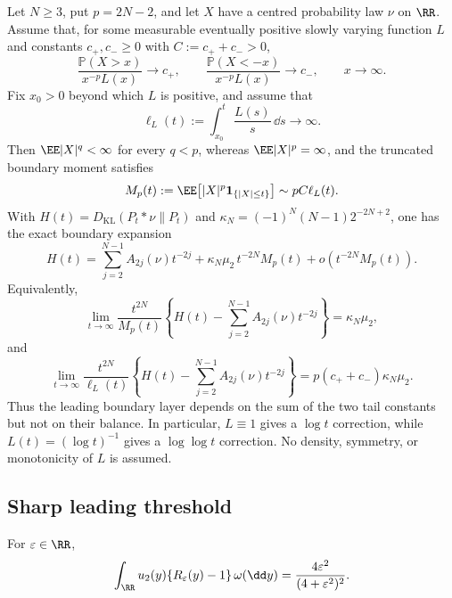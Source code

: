 \begin{theorem}%
\label{cor:main-body-conditional-missing-top-moment-tail}
Let \(N\ge3\), put \(p=2N-2\), and let \(X\) have a centred probability
law \(\nu\) on \(\RR\).  Assume that, for some measurable eventually
positive slowly varying function \(L\) and constants \(c_+,c_-\ge0\) with
\(C:=c_++c_->0\),
\[
 \frac{\mathbb P(X>x)}{x^{-p}L(x)}\longrightarrow c_+,\qquad
 \frac{\mathbb P(X<-x)}{x^{-p}L(x)}\longrightarrow c_-,
 \qquad x\to\infty.
\]
Fix \(x_0>0\) beyond which \(L\) is positive, and assume that
\[
 \ell_L(t):=\int_{x_0}^{t}\frac{L(s)}s\,\dd s\longrightarrow\infty.
\]
Then \(\EE|X|^q<\infty\) for every \(q<p\), whereas
\(\EE|X|^p=\infty\), and the truncated boundary moment satisfies
\[
 M_p(t):=\EE\!\left[|X|^p\mathbf1_{\{|X|\le t\}}\right]
 \sim pC\ell_L(t).
\]
With \(H(t)=D_{\mathrm{KL}}(P_t*\nu\|P_t)\) and
\(\kappa_N=(-1)^N(N-1)2^{-2N+2}\), one has the exact boundary expansion
\[
H(t)=
\sum_{j=2}^{N-1}A_{2j}(\nu)t^{-2j}
+\kappa_N\mu_2\,t^{-2N}M_p(t)
+o(t^{-2N}M_p(t)).
\]
Equivalently,
\[
 \lim_{t\to\infty}\frac{t^{2N}}{M_p(t)}
 \left\{H(t)-\sum_{j=2}^{N-1}A_{2j}(\nu)t^{-2j}\right\}
 =\kappa_N\mu_2,
\]
and
\[
 \lim_{t\to\infty}\frac{t^{2N}}{\ell_L(t)}
 \left\{H(t)-\sum_{j=2}^{N-1}A_{2j}(\nu)t^{-2j}\right\}
 =p(c_++c_-)\kappa_N\mu_2.
\]
Thus the leading boundary layer depends on the sum of the two tail constants
but not on their balance.  In particular, \(L\equiv1\) gives a \(\log t\)
correction, while \(L(t)=(\log t)^{-1}\) gives a \(\log\log t\)
correction.  No density, symmetry, or monotonicity of \(L\) is assumed.
\end{theorem}

\subsection{Sharp leading threshold}

\begin{lemma}%
\label{lem:second-mode-cauchy-translate-transform}
For \(\varepsilon\in\RR\),
\[
\int_{\RR}u_2(y)\{R_\varepsilon(y)-1\}\,\omega(\dd y)
=\frac{4\varepsilon^2}{(4+\varepsilon^2)^2}.
\]
\end{lemma}

